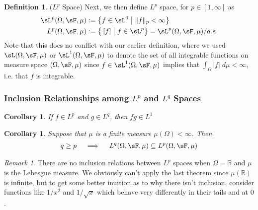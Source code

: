 \documentclass[12pt]{article}
\theoremstyle{plain}
\newtheorem{cor}[thm]{Corollary}
\theoremstyle{definition}
\newtheorem{defn}[thm]{Definition}
\theoremstyle{remark}
\newtheorem*{rmk}{Remark}
\begin{document}
\begin{defn}($L^p$ Space)
Next, we then define $L^p$ space, for $p\in[1,\infty]$ as
\begin{align*}
    \sL^p(\Omega,\sF,\mu)
    &:=\left\{ f\in\sL^0 \;\big|\; \lVert  f\rVert_p < \infty\right\} \\
    L^p(\Omega,\sF,\mu)
    &:=
    \big\{ \, [f] \; \big| \; f \in\sL^p\big\}
    = \sL^p(\Omega,\sF,\mu)/a.e.
\end{align*}
Note that this does no conflict with our earlier definition, where we
used $\sL(\Omega,\sF,\mu)$ or $\sL^1(\Omega,\sF,\mu)$ to denote the set
of all integrable functions on measure space $(\Omega,\sF,\mu)$ since
$f\in \sL^1(\Omega,\sF,\mu)$ implies that
$\int_\Omega |f| \; d\mu <\infty$, i.e. that $f$ is integrable.
\end{defn}

\subsubsection{Inclusion Relationships among $L^p$ and $L^q$ Spaces}


\begin{cor}
    If $f\in L^p$ and $g\in L^{q}$, then $fg\in L^1$

\end{cor}


\begin{cor}
Suppose that $\mu$ is a finite measure $\mu(\Omega)<\infty$.
Then
\begin{align*}
  q \geq p
  \quad\implies\quad
  L^q(\Omega,\sF,\mu)
  \subseteq
  L^p(\Omega,\sF,\mu)
\end{align*}
\end{cor}
\begin{rmk}
There are no inclusion relations between $L^p$ spaces when
$\Omega=\mathbb{R}$ and $\mu$ is the Lebesgue measure. We obviously
can't apply the last theorem since $\mu(\mathbb{R})$ is infinite, but to
get some better inuition as to why there isn't inclusion, consider
functions like $1/x^2$ and $1/\sqrt{x}$ which behave very differently in
their tails and at $0$.
\end{rmk}
\end{document}
